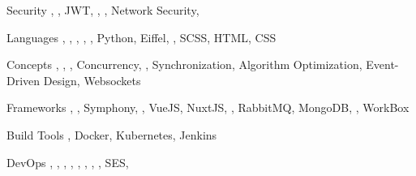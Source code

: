 

\begin{cvskills}

\cvskill
  {Security} %
  {, , JWT, , , Network Security, } %

\cvskill
  {Languages} %
  {, , , , , Python, Eiffel, , SCSS, HTML, CSS} %

\cvskill
  {Concepts} %
  {, , , Concurrency, , Synchronization, Algorithm Optimization, Event-Driven Design, Websockets} %

\cvskill
  {Frameworks} %
  {, , Symphony, , VueJS, NuxtJS, , RabbitMQ, MongoDB, , WorkBox} %


\cvskill
  {Build Tools} %
  {, Docker, Kubernetes, Jenkins} %

\cvskill
  {DevOps} %
  {, , , , , , , , SES, } %


\end{cvskills}
